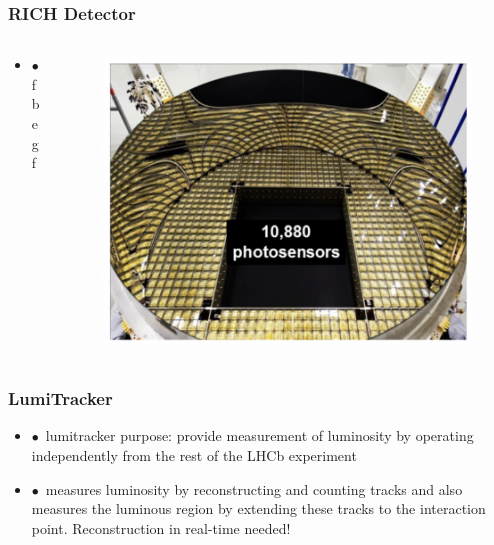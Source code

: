 \documentclass[aspectratio=1610, 12pt, xcolor=dvipsnames]{beamer}
\begin{document}
\begin{frame}\frametitle{RICH Detector}
  \begin{columns}
    \begin{column}[c]{0.48\textwidth}
      \begin{itemize}
	\item $\bullet$\, fbegf
      \end{itemize}
    \end{column}
    \begin{column}[c]{0.48\textwidth}
      \begin{figure}
	\centering
	\includegraphics[width=\textwidth]{plots/rich2.png}
      \end{figure}
    \end{column}
  \end{columns}
\end{frame}

\begin{frame}\frametitle{LumiTracker}
  \begin{itemize}
    \item $\bullet$\, lumitracker purpose: provide measurement of luminosity by operating independently from the rest of the LHCb experiment
    \item $\bullet$\, \to measures luminosity by reconstructing and counting tracks and also measures the luminous region by extending these tracks to the interaction point.
Reconstruction in real-time needed!
  \end{itemize}
\end{frame}
\end{document}
